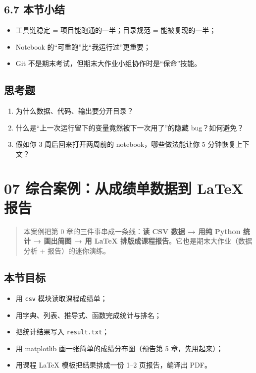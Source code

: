\subsection{6.7 本节小结}\label{ux672cux8282ux5c0fux7ed3-1}

\begin{itemize}
\tightlist
\item
  工具链稳定 = 项目能跑通的一半；目录规范 = 能被复现的一半；
\item
  Notebook 的``可重跑''比``我运行过''更重要；
\item
  Git 不是期末考试，但期末大作业小组协作时是``保命''技能。
\end{itemize}

\subsection{思考题}\label{ux601dux8003ux9898-1}

\begin{enumerate}
\def\labelenumi{\arabic{enumi}.}
\tightlist
\item
  为什么数据、代码、输出要分开目录？
\item
  什么是``上一次运行留下的变量竟然被下一次用了''的隐藏 bug？如何避免？
\item
  假如你 3 周后回来打开两周前的 notebook，哪些做法能让你 5
  分钟恢复上下文？
\end{enumerate}

\section{07 综合案例：从成绩单数据到 LaTeX
报告}\label{ux7efcux5408ux6848ux4f8bux4eceux6210ux7ee9ux5355ux6570ux636eux5230-latex-ux62a5ux544a}

\begin{quote}
本案例把第 0 章的三件事串成一条线：\textbf{读 CSV 数据 → 用纯 Python
统计 → 画出简图 → 用 LaTeX 排版成课程报告}。它也是期末大作业（数据分析 +
报告）的迷你演练。
\end{quote}

\subsection{本节目标}\label{ux672cux8282ux76eeux6807-6}

\begin{itemize}
\tightlist
\item
  用 \texttt{csv} 模块读取课程成绩单；
\item
  用字典、列表、推导式、函数完成统计与排名；
\item
  把统计结果写入 \texttt{result.txt}；
\item
  用 matplotlib 画一张简单的成绩分布图（预告第 5 章，先用起来）；
\item
  用课程 LaTeX 模板把结果排成一份 1--2 页报告，编译出 PDF。
\end{itemize}

